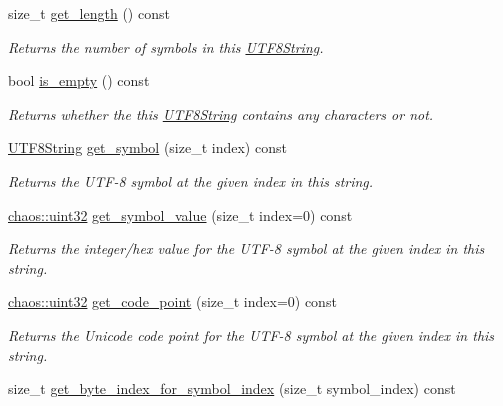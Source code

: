 \begin{DoxyCompactItemize}
size\+\_\+t \hyperlink{classchaos_1_1uni_1_1_u_t_f8_string_a25fc75f62483131e35860598f70c96d8}{get\+\_\+length} () const 
\begin{DoxyCompactList}\small\item\em Returns the number of symbols in this \hyperlink{classchaos_1_1uni_1_1_u_t_f8_string}{U\+T\+F8\+String}. \end{DoxyCompactList}\item 
bool \hyperlink{classchaos_1_1uni_1_1_u_t_f8_string_ad99ed42fcbd51651e6d626bab469af59}{is\+\_\+empty} () const 
\begin{DoxyCompactList}\small\item\em Returns whether the this \hyperlink{classchaos_1_1uni_1_1_u_t_f8_string}{U\+T\+F8\+String} contains any characters or not. \end{DoxyCompactList}\item 
\hyperlink{classchaos_1_1uni_1_1_u_t_f8_string}{U\+T\+F8\+String} \hyperlink{classchaos_1_1uni_1_1_u_t_f8_string_a32e14ce1bc404c36fe73741088daaaef}{get\+\_\+symbol} (size\+\_\+t index) const 
\begin{DoxyCompactList}\small\item\em Returns the U\+T\+F-\/8 symbol at the given index in this string. \end{DoxyCompactList}\item 
\hyperlink{namespacechaos_a3b3a47ba1e284655bf1a30c441121c60}{chaos\+::uint32} \hyperlink{classchaos_1_1uni_1_1_u_t_f8_string_a0de9e9c20e4aa5f76daf752788db2039}{get\+\_\+symbol\+\_\+value} (size\+\_\+t index=0) const 
\begin{DoxyCompactList}\small\item\em Returns the integer/hex value for the U\+T\+F-\/8 symbol at the given index in this string. \end{DoxyCompactList}\item 
\hyperlink{namespacechaos_a3b3a47ba1e284655bf1a30c441121c60}{chaos\+::uint32} \hyperlink{classchaos_1_1uni_1_1_u_t_f8_string_a0032f18868d33ca5f5855657c4d2d147}{get\+\_\+code\+\_\+point} (size\+\_\+t index=0) const 
\begin{DoxyCompactList}\small\item\em Returns the Unicode code point for the U\+T\+F-\/8 symbol at the given index in this string. \end{DoxyCompactList}\item 
size\+\_\+t \hyperlink{classchaos_1_1uni_1_1_u_t_f8_string_a54d7b7377d4f22b593dc072e8e929529}{get\+\_\+byte\+\_\+index\+\_\+for\+\_\+symbol\+\_\+index} (size\+\_\+t symbol\+\_\+index) const 

\end{DoxyCompactItemize}
